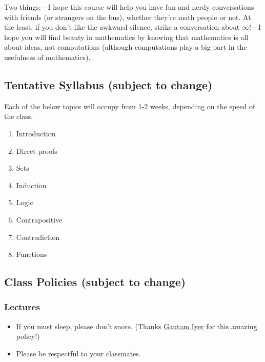 \documentclass[
]{article}
\providecommand{\tightlist}{%
  \setlength{\itemsep}{0pt}\setlength{\parskip}{0pt}}
\begin{document}
Two things:
- I hope this course will help you have fun and nerdy conversations with friends (or strangers on the bus), whether they're math people or not.
At the least, if you don't like the awkward silence, strike a conversation about \(\infty\)!
- I hope you will find beauty in mathematics by knowing that mathematics is all about ideas,
not computations (although computations play a big part in the usefulness of mathematics).

\subsection*{Tentative Syllabus (subject to change)}\label{tentative-syllabus-subject-to-change}

Each of the below topics will occupy from 1-2 weeks, depending on the speed of the class.

\begin{enumerate}
\def\labelenumi{\arabic{enumi}.}
\item
  Introduction
\item
  Direct proofs
\item
  Sets
\item
  Induction
\item
  Logic
\item
  Contrapositive
\item
  Contradiction
\item
  Functions
\end{enumerate}

\subsection*{Class Policies (subject to change)}\label{class-policies-subject-to-change}

\subsubsection*{Lectures}\label{lectures}

\begin{itemize}
\tightlist
\item
  If you must sleep, please don't snore. (Thanks \href{https://www.math.cmu.edu/~gautam/}{Gautam Iyer} for this amazing policy!)
\item
  Please be respectful to your classmates.
\end{itemize}
\end{document}

